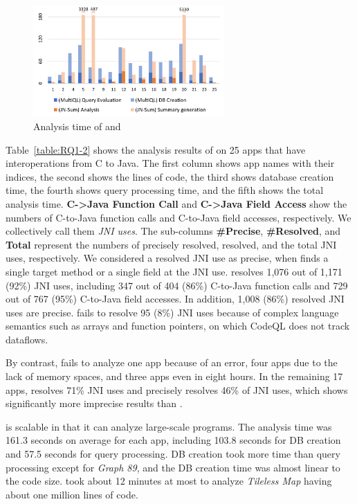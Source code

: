 \begin{figure}
  \centering
  \vspace{2mm}
  \includegraphics[width=0.65\textwidth]{img/graph}
  \vspace*{-.5em}
  \caption{Analysis time of \ours and \lees}
  \label{fig:graph}
\vspace*{-1em}
\end{figure}

Table~\ref{table:RQ1-2} shows the analysis results of \ours on 25 apps that
have interoperations from C to Java.  The first column shows app names with
their indices, the second shows the lines of code, the third shows database
creation time, the fourth shows query processing time, and the fifth shows the
total analysis time.  {\bf C->Java Function Call} and {\bf C->Java Field
Access} show the numbers of C-to-Java function calls and C-to-Java field
accesses, respectively. We collectively call them \emph{JNI uses}.  The
sub-columns {\bf \#Precise}, {\bf \#Resolved}, and {\bf Total} represent the
numbers of precisely resolved, resolved, and the total JNI uses, respectively.
We considered a resolved JNI use as precise, when \ours finds a single target
method or a single field at the JNI use.  \ours resolves 1,076 out of 1,171
(92\%) JNI uses, including 347 out of 404 (86\%) C-to-Java function calls and
729 out of 767 (95\%) C-to-Java field accesses.  In addition, 1,008 (86\%)
resolved JNI uses are precise.  \ours fails to resolve 95 (8\%) JNI uses
because of complex language semantics such as arrays and function pointers, on
which CodeQL does not track dataflows.

By contrast, \lees fails to analyze one app because of an error, four apps due
to the lack of memory spaces, and three apps even in eight hours.  In the
remaining 17 apps, \lees resolves 71\% JNI uses and precisely resolves 46\% of
JNI uses, which shows significantly more imprecise results than \ours.

\ours is scalable in that it can analyze large-scale programs.  The analysis
time was 161.3 seconds on average for each app, including 103.8 seconds for DB
creation and 57.5 seconds for query processing.  DB creation took more time
than query processing except for {\it Graph 89}, and the DB creation time was
almost linear to the code size.  \ours took about 12 minutes at most to analyze
{\it Tileless Map} having about one million lines of code.

